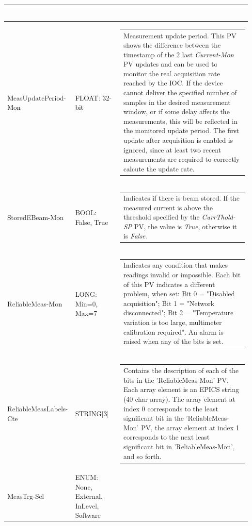 \documentclass[openany]{article}
\begin{document}
\begin{longtable}{| m{3.0cm} m{4.5cm} m{7.0cm} |}
\begin{tabular}{@{}m{6cm}@{}}
						\end{tabular} \\ \hline
		MeasUpdatePeriod-Mon & FLOAT: 32-bit & \begin{tabular}{@{}m{6cm}@{}}
	    					Measurement update period. This PV shows the difference between the timestamp of the 2 last \emph{Current-Mon} PV updates and can be used to monitor the real acquisition rate reached by the IOC. If the device cannot deliver the specified number of samples in the desired measurement window, or if some delay affects the measurements, this will be reflected in the monitored update period. The first update after acquisition is enabled is ignored, since at least two recent measurements are required to correctly calcute the update rate.
						\end{tabular} \\ \hline
		StoredEBeam-Mon & BOOL: False, True & \begin{tabular}{@{}m{6cm}@{}}
	    					Indicates if there is beam stored. If the measured current is above the threshold specified by the \emph{CurrThold-SP} PV, the value is \emph{True}, otherwise it is \emph{False}.
						\end{tabular} \\ \hline
		ReliableMeas-Mon & LONG: Min=0, Max=7 & \begin{tabular}{@{}m{6cm}@{}}
	    					Indicates any condition that makes readings invalid or impossible. Each bit of this PV indicates a different problem, when set: Bit 0 = "Disabled acquisition"; Bit 1 = "Network disconnected"; Bit 2 = "Temperature variation is too large, multimeter calibration required". An alarm is raised when any of the bits is set.
						\end{tabular} \\ \hline
		ReliableMeasLabels-Cte & STRING[3] & \begin{tabular}{@{}m{6cm}@{}}
	    					Contains the description of each of the bits in the 'ReliableMeas-Mon' PV. Each array element is an EPICS string (40 char array). The array element at index 0 corresponds to the least significant bit in the 'ReliableMeas-Mon' PV, the array element at index 1 corresponds to the next least significant bit in 'ReliableMeas-Mon', and so forth.
						\end{tabular} \\ \hline
		MeasTrg-Sel & ENUM: None, External, InLevel, Software & \begin{tabular}{@{}m{6cm}@{}}

\end{tabular}
\end{longtable}
\end{document}
